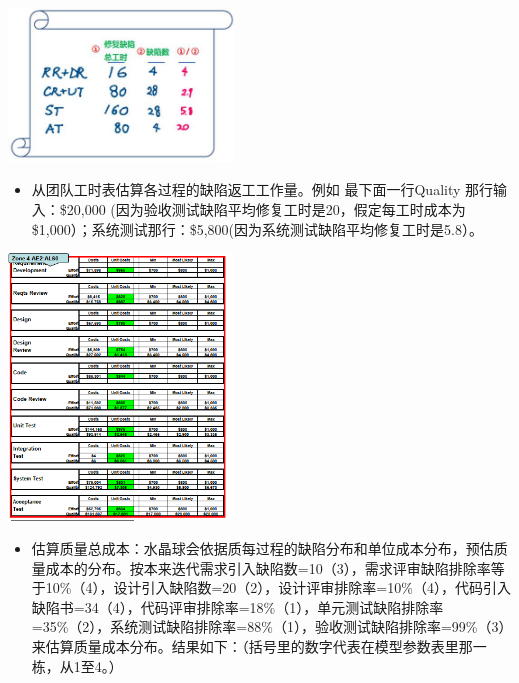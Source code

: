 \includegraphics[width=6cm]{4reworkByPhaseScreenshot_2021-12-01_2148381.jpg}

\begin{itemize}
\tightlist
\item
  从团队工时表估算各过程的缺陷返工工作量。例如 最下面一行Quality
  那行输入：\$20,000 (因为验收测试缺陷平均修复工时是20，假定每工时成本为
  \$1,000）；系统测试那行：\$5,800(因为系统测试缺陷平均修复工时是5.8）。
\end{itemize}

\includegraphics[width=6cm]{微信截图_20231031153355.png}

\begin{itemize}
\tightlist
\item
  估算质量总成本：水晶球会依据质每过程的缺陷分布和单位成本分布，预估质量成本的分布。按本来迭代需求引入缺陷数=10（3），需求评审缺陷排除率等于10\%（4），设计引入缺陷数=20（2），设计评审排除率=10\%（4），代码引入缺陷书=34（4），代码评审排除率=18\%（1），单元测试缺陷排除率=35\%（2），系统测试缺陷排除率=88\%（1），验收测试缺陷排除率=99\%（3）来估算质量成本分布。结果如下：（括号里的数字代表在模型参数表里那一栋，从1至4。）
\end{itemize}



